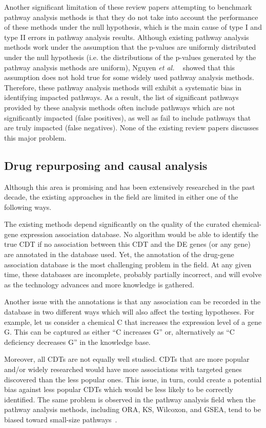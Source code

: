 \documentclass[Minh_PhD_thesis.tex]{subfiles}
\begin{document}
Another significant limitation of these review papers attempting to benchmark pathway analysis methods is that they do not take into account the performance of these methods under the null hypothesis, which is the main cause of type I and type II errors in pathway analysis results. 
Although existing pathway analysis methods work under the assumption that the p-values are uniformly distributed under the null hypothesis (i.e. the distributions of the p-values generated by the pathway analysis methods are uniform), Nguyen \textit{et al.} ~\cite{nguyen2017DANUBE, nguyen2018network} showed that this assumption does not hold true for some widely used pathway analysis methods. 
Therefore, these pathway analysis methods will exhibit a systematic bias in identifying impacted pathways.
As a result, the list of significant pathways provided by these  analysis methods often include pathways which are not significantly impacted (false positives), as well as fail to include pathways that are truly impacted (false negatives).
None of the existing review papers discusses this major problem.

\subsection{Drug repurposing and causal analysis}

Although this area is promising and has been extensively researched in the past decade, the existing approaches in the field are limited in either one of the following ways.

The existing methods depend significantly on the quality of the curated chemical-gene expression association database. 
No algorithm would be able to identify the true CDT if no association between this CDT and the DE genes (or any gene) are annotated in the database used.
Yet, the annotation of the drug-gene association database is the most challenging problem in the field. 
At any given time, these databases are incomplete, probably partially incorrect, and will evolve as the technology advances and more knowledge is gathered. 

Another issue with the annotations is that any association can be recorded in the database in two different ways which will also affect the testing hypotheses.
For example, let us consider a chemical C that increases  the   expression level of a gene G. This can be captured as either ``C increases G'' or, alternatively as ``C deficiency decreases G'' in the knowledge base. 

Moreover, all CDTs are not equally well studied. CDTs that are more popular and/or widely researched would have more associations with targeted genes discovered than the less popular ones.
This issue, in turn, could create a potential bias against less popular CDTs which would be less likely to be correctly identified.
The same problem is observed in the pathway analysis field when the pathway analysis methods, including ORA, KS, Wilcoxon, and GSEA, tend to be biased toward small-size pathways~\cite{nguyen2019identifying}.
\end{document}
